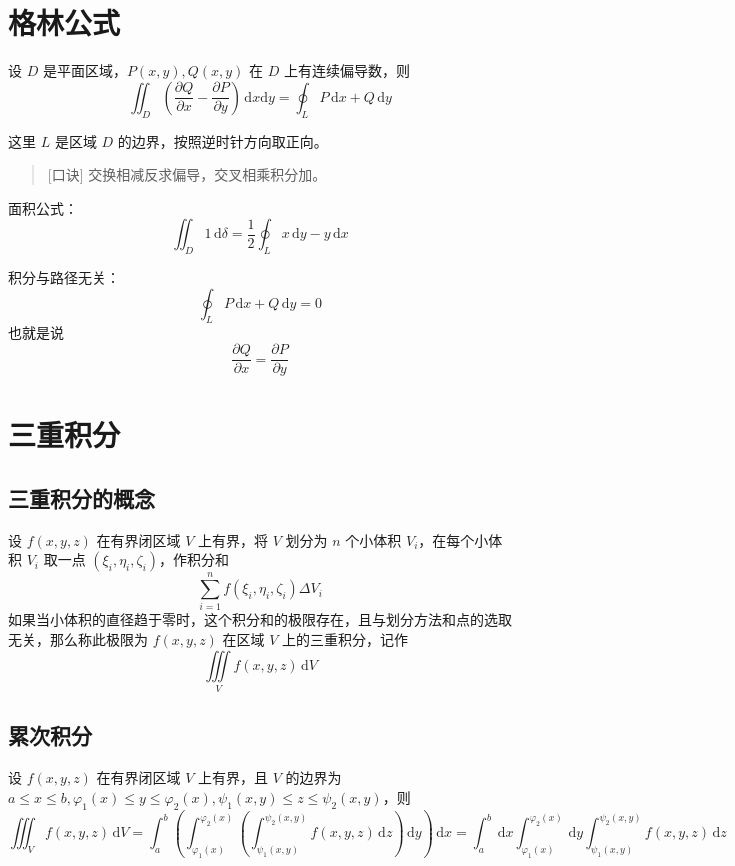 \section{格林公式}

\begin{theorem}
    设 $D$ 是平面区域，$P(x,y),Q(x,y)$ 在 $D$ 上有连续偏导数，则
    \[
        \iint_{D} \left( \frac{\partial Q}{\partial x} - \frac{\partial P}{\partial y} \right) \, \mathrm{d}x \mathrm{d}y = \oint_{L} P \, \mathrm{d}x + Q \, \mathrm{d}y
    \]
\end{theorem}

这里 $L$ 是区域 $D$ 的边界，按照逆时针方向取正向。

\begin{quote}[口诀]
    交换相减反求偏导，交叉相乘积分加。
\end{quote}

面积公式：
\[
    \iint_{D} 1 \, \mathrm{d}\delta = \frac{1}{2} \oint_{L} x \, \mathrm{d}y - y \, \mathrm{d}x
\]

积分与路径无关：
\[
    \oint_{L} P \, \mathrm{d}x + Q \, \mathrm{d}y = 0
\]
也就是说
\[
    \frac{\partial Q}{\partial x} = \frac{\partial P}{\partial y}
\]

\section{三重积分}

\subsection{三重积分的概念}

\begin{definition}
    设 $f(x,y,z)$ 在有界闭区域 $V$ 上有界，将 $V$ 划分为 $n$ 个小体积 $V_{i}$，在每个小体积 $V_{i}$ 取一点 $(\xi_{i},\eta_{i},\zeta_{i})$，作积分和
    \[
        \sum_{i=1}^{n} f(\xi_{i},\eta_{i},\zeta_{i}) \Delta V_{i}
    \]
    如果当小体积的直径趋于零时，这个积分和的极限存在，且与划分方法和点的选取无关，那么称此极限为 $f(x,y,z)$ 在区域 $V$ 上的三重积分，记作
    \[
        \iiint\limits_{V} f(x,y,z) \, \mathrm{d}V
    \]
\end{definition}

\subsection{累次积分}

\begin{theorem}
    设 $f(x,y,z)$ 在有界闭区域 $V$ 上有界，且 $V$ 的边界为 $a \leq x \leq b, \varphi_{1}(x) \leq y \leq \varphi_{2}(x), \psi_{1}(x,y) \leq z \leq \psi_{2}(x,y)$，则
    \[
        \iiint_{V} f(x,y,z) \, \mathrm{d}V = \int_{a}^{b} \left( \int_{\varphi_{1}(x)}^{\varphi_{2}(x)} \left( \int_{\psi_{1}(x,y)}^{\psi_{2}(x,y)} f(x,y,z) \, \mathrm{d}z \right) \, \mathrm{d}y \right) \, \mathrm{d}x = \int_{a}^{b} \, \mathrm{d}x \int_{\varphi_{1}(x)}^{\varphi_{2}(x)} \, \mathrm{d}y \int_{\psi_{1}(x,y)}^{\psi_{2}(x,y)} f(x,y,z) \, \mathrm{d}z
    \]
\end{theorem}

